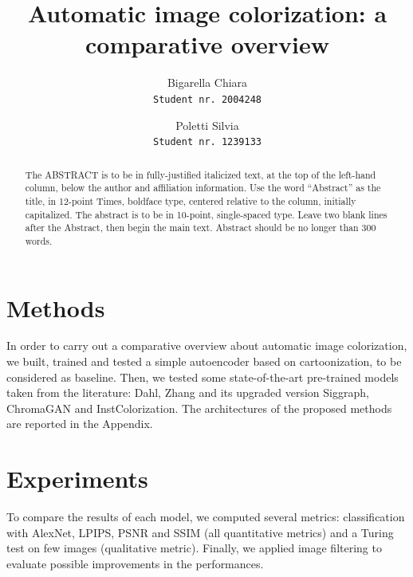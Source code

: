 \documentclass[10pt,twocolumn,letterpaper]{article}
\begin{document}
\title{Automatic image colorization: a comparative overview}
\author{Bigarella Chiara\\
{\tt\small Student nr. 2004248}
\and
Poletti Silvia\\
{\tt\small Student nr. 1239133}
}

\maketitle

\begin{abstract}
   The ABSTRACT is to be in fully-justified italicized text, at the top
   of the left-hand column, below the author and affiliation
   information. Use the word ``Abstract'' as the title, in 12-point
   Times, boldface type, centered relative to the column, initially
   capitalized. The abstract is to be in 10-point, single-spaced type.
   Leave two blank lines after the Abstract, then begin the main text.
   Abstract should be no longer than 300 words.
\end{abstract}





\section{Methods}
In order to carry out a comparative overview about automatic image colorization, we built, trained and tested a simple autoencoder based on cartoonization, to be considered as baseline. Then, we tested some state-of-the-art pre-trained models taken from the literature: Dahl, Zhang and its upgraded version Siggraph, ChromaGAN and InstColorization. The architectures of the proposed methods are reported in the Appendix.








\section{Experiments}
To compare the results of each model, we computed several metrics: classification with AlexNet, LPIPS, PSNR and SSIM (all quantitative metrics) and a Turing test on few images (qualitative metric). Finally, we applied image filtering to evaluate possible improvements in the performances.
\end{document}
